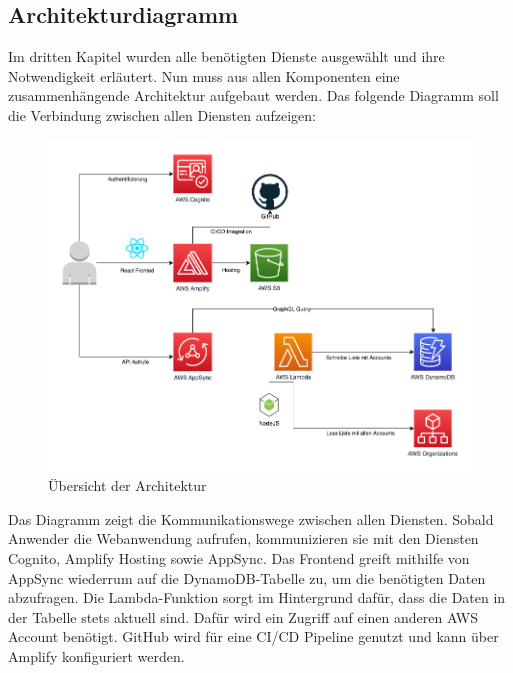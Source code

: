 \subsection{Architekturdiagramm }

Im dritten Kapitel wurden alle benötigten Dienste ausgewählt und ihre Notwendigkeit erläutert.
Nun muss aus allen Komponenten eine zusammenhängende Architektur aufgebaut werden.
Das folgende Diagramm soll die Verbindung zwischen allen Diensten aufzeigen:

\begin{figure}[htbp]
    \centering
    \includegraphics[width=1.0\textwidth]{50-Implementierung/Architektur.png}
    \caption{Übersicht der Architektur}
    \label{fig:meine-grafik}
\end{figure}

Das Diagramm zeigt die Kommunikationswege zwischen allen Diensten.
Sobald Anwender die Webanwendung aufrufen, kommunizieren sie mit den Diensten Cognito, Amplify Hosting sowie AppSync.
Das Frontend greift mithilfe von AppSync wiederrum auf die DynamoDB-Tabelle zu, um die benötigten Daten abzufragen.
Die Lambda-Funktion sorgt im Hintergrund dafür, dass die Daten in der Tabelle stets aktuell sind.
Dafür wird ein Zugriff auf einen anderen AWS Account benötigt.
GitHub wird für eine CI/CD Pipeline genutzt und kann über Amplify konfiguriert werden.

